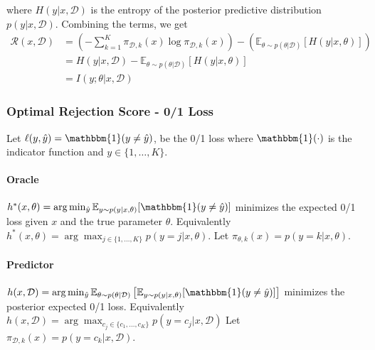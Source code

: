 where $H(y|x,\mathcal{D})$ is the entropy of the posterior predictive distribution $p(y|x,\mathcal{D})$. Combining the terms, we get
\begin{align}
\mathcal{R}(x, \mathcal{D}) &= \left( - \sum_{k=1}^K \pi_{\mathcal{D},k}(x) \log \pi_{\mathcal{D},k}(x) \right) - \left( \mathbb{E}_{\theta \sim p(\theta|\mathcal{D})} [H(y|x,\theta)] \right) \nonumber \\
&= H(y|x,\mathcal{D}) - \mathbb{E}_{\theta \sim p(\theta|\mathcal{D})} [H(y|x,\theta)] \nonumber \\
&= \boxed{I(y; \theta | x, \mathcal{D})}
\end{align}


\subsubsection{Optimal Rejection Score - 0/1 Loss}
Let $\ell(y, \hat{y}) = \mathbbm{1}(y \neq \hat{y})$, be the 0/1 loss where $\mathbbm{1}(\cdot)$ is the indicator function and $y\in\{1, \ldots, K\}$.

\paragraph{Oracle}
$h^*(x, \theta) = \arg\min_{\hat{y}} \mathbb{E}_{y \sim p(y|x, \theta)}[\mathbbm{1}(y \neq \hat{y})]$ minimizes the expected 0/1 loss given $x$ and the true parameter $\theta$. Equivalently $h^*(x, \theta) = \arg\max_{j \in \{1, \ldots, K\}} p(y=j|x,\theta)$. Let $\pi_{\theta,k}(x) = p(y=k|x,\theta)$.

\paragraph{Predictor}
$h(x, \mathcal{D}) = \arg\min_{\hat{y}} \mathbb{E}_{\theta \sim p(\theta|\mathcal{D})} \left[ \mathbb{E}_{y \sim p(y|x, \theta)} [\mathbbm{1}(y \neq \hat{y})] \right]$ minimizes the posterior expected 0/1 loss. Equivalently $h(x, \mathcal{D}) = \arg\max_{c_j \in \{c_1, \ldots, c_K\}} p(y=c_j|x,\mathcal{D})$ Let $\pi_{\mathcal{D},k}(x) = p(y=c_k|x,\mathcal{D})$.

